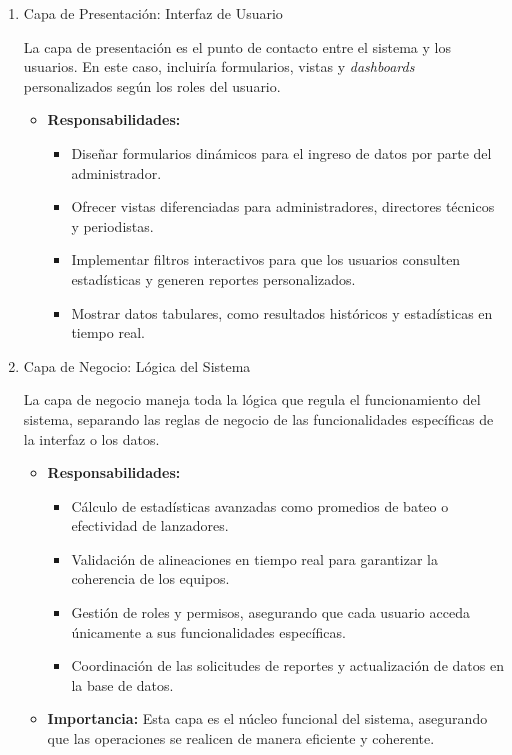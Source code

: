 \documentclass{report}
\begin{document}
    \begin{enumerate}
        \item Capa de Presentación: Interfaz de Usuario
        
        La capa de presentación es el punto de contacto entre el sistema y los usuarios. En este caso, incluiría 
        formularios, vistas y \textit{dashboards} personalizados según los roles del usuario.
        
        \begin{itemize}
            \item \textbf{Responsabilidades:}
            \begin{itemize}
                \item Diseñar formularios dinámicos para el ingreso de datos por parte del administrador.
                \item Ofrecer vistas diferenciadas para administradores, directores técnicos y periodistas.
                \item Implementar filtros interactivos para que los usuarios consulten estadísticas y generen 
                reportes personalizados.
                \item Mostrar datos tabulares, como resultados históricos y estadísticas en tiempo real.
            \end{itemize}
        \end{itemize}
        
        \item Capa de Negocio: Lógica del Sistema
        
        La capa de negocio maneja toda la lógica que regula el funcionamiento del sistema, separando las reglas de 
        negocio de las funcionalidades específicas de la interfaz o los datos.
        
        \begin{itemize}
            \item \textbf{Responsabilidades:}
            \begin{itemize}
                \item Cálculo de estadísticas avanzadas como promedios de bateo o efectividad de lanzadores.
                \item Validación de alineaciones en tiempo real para garantizar la coherencia de los equipos.
                \item Gestión de roles y permisos, asegurando que cada usuario acceda únicamente a sus funcionalidades 
                específicas.
                \item Coordinación de las solicitudes de reportes y actualización de datos en la base de datos.
            \end{itemize}
            \item \textbf{Importancia:} 
            Esta capa es el núcleo funcional del sistema, asegurando que las operaciones se realicen de manera 
            eficiente y coherente.
        \end{itemize}


\end{enumerate}
\end{document}
